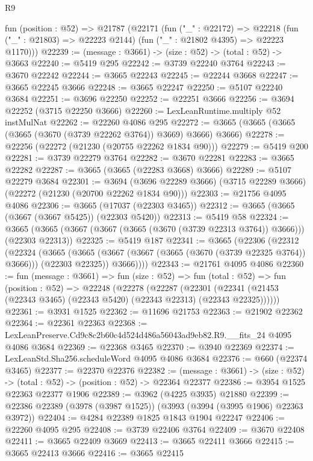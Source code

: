 \begin{lexlean}{R9}
\begin{coremodule}
  fun (position : @52) =>
  @21787
    (@22171
      (fun ("_" : @22172) =>
      @22218 (fun ("_" : @21803) => @22223 @2144) (fun ("_" : @21802 @4395) => @22223 @1170)))
@22239 := (message : @3661) -> (size : @52) -> (total : @52) -> @3663
@22240 := @5419 @295
@22242 := @3739 @22240 @3764
@22243 := @3670 @22242
@22244 := @3665 @22243
@22245 := @22244 @3668
@22247 := @3665 @22245 @3666
@22248 := @3665 @22247
@22250 := @5107 @22240 @3684
@22251 := @3696 @22250
@22252 := @22251 @3666
@22256 := @3694 @22252 (@3715 @22250 @3666)
@22260 := LexLeanRuntime.multiply @52 instMulNat
@22262 := @22260 @4086 @295
@22272 := @3665 (@3665 (@3665 (@3665 (@3670 (@3739 @22262 @3764)) @3669) @3666) @3666)
@22278 := @22256 (@22272 (@21230 (@20755 @22262 @1834 @90)))
@22279 := @5419 @200
@22281 := @3739 @22279 @3764
@22282 := @3670 @22281
@22283 := @3665 @22282
@22287 := @3665 (@3665 (@22283 @3668) @3666)
@22289 := @5107 @22279 @3684
@22301 := @3694
    (@3696 @22289 @3666)
    (@3715 @22289 @3666)
    (@22272 (@21230 (@20700 @22262 @1834 @90)))
@22303 := @21756 @4095 @4086
@22306 := @3665 (@17037 (@22303 @3465))
@22312 := @3665 (@3665 (@3667 (@3667 @5425)) (@22303 @5420))
@22313 := @5419 @58
@22324 := @3665 (@3665 (@3667 (@3667 (@3665 (@3670 (@3739 @22313 @3764)) @3666))) (@22303 @22313))
@22325 := @5419 @187
@22341 := @3665
    (@22306
      (@22312
        (@22324
          (@3665
            (@3665 (@3667 (@3667 (@3665 (@3670 (@3739 @22325 @3764)) @3666))) (@22303 @22325))
            @3666))))
@22343 := @21761 @4095 @4086
@22360 := fun (message : @3661) =>
  fun (size : @52) =>
  fun (total : @52) =>
  fun (position : @52) =>
  @22248
    (@22278
      (@22287
        (@22301 (@22341 (@21453 (@22343 @3465) (@22343 @5420) (@22343 @22313) (@22343 @22325))))))
@22361 := @3931 @1525
@22362 := @11696 @21753
@22363 := @21902 @22362
@22364 := @22361 @22363
@22368 := LexLeanPreserve.Cd9c8c2b60c4d524d486a56043ad9eb82.R9.__fits_24 @4095 @4086 @3684
@22369 := @22368 @3465
@22370 := @3940 @22369
@22374 := LexLeanStd.Sha256.scheduleWord @4095 @4086 @3684
@22376 := @660 (@22374 @3465)
@22377 := @22370 @22376
@22382 := (message : @3661) -> (size : @52) -> (total : @52) -> (position : @52) -> @22364 @22377
@22386 := @3954 @1525 @22363 @22377 @1906
@22389 := @3962 (@4225 @3935) @21880
@22399 := @22386 @22389 (@3978 (@3987 @1525)) (@3993 (@3994 (@3995 @1906) @22363 @3972))
@22404 := @4284 @22389 @1825 @1843 @1904 @22247
@22406 := @22260 @4095 @295
@22408 := @3739 @22406 @3764
@22409 := @3670 @22408
@22411 := @3665 @22409 @3669
@22413 := @3665 @22411 @3666
@22415 := @3665 @22413 @3666
@22416 := @3665 @22415

\end{coremodule}
\end{lexlean}
